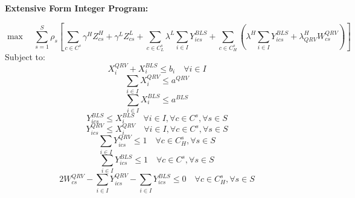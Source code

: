 \documentclass[12pt]{report}
\begin{document}
\noindent\textbf{Extensive Form Integer Program:}
\begin{equation}
    \label{Objective}
     \max \quad \sum_{s=1}^S \rho_s
     \left[
        \sum_{c \in C^s}\gamma^HZ^H_{cs} + \gamma^LZ^L_{cs} 
        + \sum_{c \in C^s_L}\lambda^L\sum_{i \in I} Y^{BLS}_{ics}
        + \sum_{c \in C^s_H}
       \left(
        \lambda^H\sum_{i \in I} Y^{BLS}_{ics} + 
        \lambda^H_{QRV}W^{QRV}_{cs}
       \right)
    \right]
\end{equation}
Subject to:
    \begin{equation}
        \label{Eassign to stations}
        X^{QRV}_{i} + X^{BLS}_{i} \leq b_{i} \quad \forall i \in I
    \end{equation}
     \begin{equation}
        \label{Eassign all QRVs}
        \sum_{ i \in I} X^{QRV}_{i} \leq a^{QRV} 
    \end{equation}
     \begin{equation}
        \label{Eassign all BLSs}
        \sum_{ i \in I} X^{BLS}_{i} \leq a^{BLS} 
    \end{equation}
    \begin{equation}
        \label{EBLSloc}
        Y^{BLS}_{ics} \leq X^{BLS}_{i}  \quad  \forall i \in I, \forall c \in C^s, \forall s \in S  
    \end{equation}
    \begin{equation}
        \label{EQRVloc}
        Y^{QRV}_{ics} \leq X^{QRV}_{i}  \quad \forall i \in I, \forall c \in C^s, \forall s \in S  
    \end{equation}
    \begin{equation}
        \label{Eatmost1QRV}
        \sum_{i \in I} Y^{QRV}_{ics} \leq 1 \quad \forall c \in C^s_H , \forall s \in S  
    \end{equation}
    \begin{equation}
        \label{Eatmost1BLS}
    \sum_{i \in I} Y^{BLS}_{ics} \leq 1  \quad \forall c \in C^s, \forall s \in S  
    \end{equation}
    \begin{equation}
        \label{EWcs}
         2W^{QRV}_{cs} - \sum_{i \in I} Y^{QRV}_{ics} - \sum_{i \in I}Y^{BLS}_{ics} \leq 0  \quad \forall c \in C^s_H, \forall s \in S  
    \end{equation}
\end{document}
